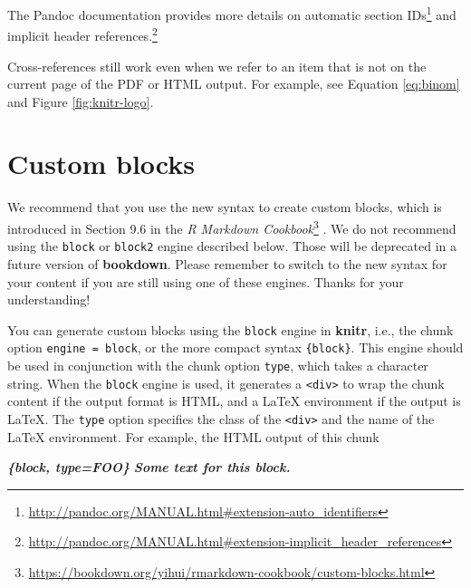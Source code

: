\documentclass[
  12pt,
]{krantz}
\makeatletter
\newenvironment{Shaded}{\begin{snugshade}}{\end{snugshade}}
\newcommand{\InformationTok}[1]{\textcolor[rgb]{0.56,0.35,0.01}{\textbf{\textit{#1}}}}
\renewcommand{\href}[2]{#2\footnote{\url{#1}}}
\newenvironment{kframe}{%
\medskip{}
\setlength{\fboxsep}{.8em}
 \def\at@end@of@kframe{}%
 \ifinner\ifhmode%
  \def\at@end@of@kframe{\end{minipage}}%
  \begin{minipage}{\columnwidth}%
 \fi\fi%
 \def\FrameCommand##1{\hskip\@totalleftmargin \hskip-\fboxsep
 \colorbox{shadecolor}{##1}\hskip-\fboxsep
     \hskip-\linewidth \hskip-\@totalleftmargin \hskip\columnwidth}%
 \MakeFramed {\advance\hsize-\width
   \@totalleftmargin\z@ \linewidth\hsize
   \@setminipage}}%
 {\par\unskip\endMakeFramed%
 \at@end@of@kframe}
\newenvironment{rmdblock}[1]
  {
  \begin{itemize}
  \renewcommand{\labelitemi}{
    \raisebox{-.7\height}[0pt][0pt]{
      {\setkeys{Gin}{width=3em,keepaspectratio}\texttt{[image: images/\#1]}}
    }
  }
  \setlength{\fboxsep}{1em}
  \begin{kframe}
  \item
  }
  {
  \end{kframe}
  \end{itemize}
  }
\newenvironment{rmdimportant}
  {\begin{rmdblock}{important}}
  {\end{rmdblock}}
\theoremstyle{definition}
\theoremstyle{definition}
\theoremstyle{definition}
\theoremstyle{definition}
\theoremstyle{remark}
\makeatother
\begin{document}
The Pandoc documentation provides more details on \href{http://pandoc.org/MANUAL.html\#extension-auto_identifiers}{automatic section IDs} and \href{http://pandoc.org/MANUAL.html\#extension-implicit_header_references}{implicit header references.}

Cross-references still work even when we refer to an item that is not on the current page of the PDF or HTML output. For example, see Equation \eqref{eq:binom} and Figure \ref{fig:knitr-logo}.

\hypertarget{custom-blocks}{%
\section{Custom blocks}\label{custom-blocks}}

\begin{rmdimportant}
We recommend that you use the new syntax to create custom blocks, which is introduced in \href{https://bookdown.org/yihui/rmarkdown-cookbook/custom-blocks.html}{Section 9.6 in the \emph{R Markdown Cookbook}} \citep{rmarkdown2020}. We do not recommend using the \texttt{block} or \texttt{block2} engine described below. Those will be deprecated in a future version of \textbf{bookdown}. Please remember to switch to the new syntax for your content if you are still using one of these engines. Thanks for your understanding!

\end{rmdimportant}

You can generate custom blocks using the \texttt{block} engine in \textbf{knitr}, i.e., the chunk option \texttt{engine\ =\ \textquotesingle{}block\textquotesingle{}}, or the more compact syntax \texttt{\textasciigrave{}\textasciigrave{}\textasciigrave{}\{block\}}. This engine should be used in conjunction with the chunk option \texttt{type}, which takes a character string. When the \texttt{block} engine is used, it generates a \texttt{\textless{}div\textgreater{}} to wrap the chunk content if the output format is HTML, and a LaTeX environment if the output is LaTeX. The \texttt{type} option specifies the class of the \texttt{\textless{}div\textgreater{}} and the name of the LaTeX environment. For example, the HTML output of this chunk

\begin{Shaded}
\begin{Highlighting}[]
\InformationTok{\textasciigrave{}\textasciigrave{}\textasciigrave{}\{block, type=\textquotesingle{}FOO\textquotesingle{}\}}
\InformationTok{Some text for this block.}
\InformationTok{\textasciigrave{}\textasciigrave{}\textasciigrave{}}
\end{Highlighting}
\end{Shaded}
\end{document}
